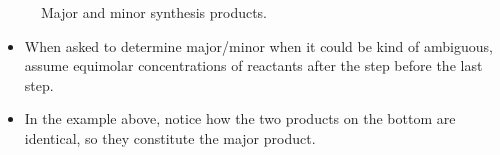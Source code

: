 \documentclass[../notes.tex]{subfiles}
\begin{document}
\begin{itemize}
\begin{figure}[H]
        \caption{Major and minor synthesis products.}
        \label{fig:majorMinor}
    \end{figure}
    \begin{itemize}
        \item When asked to determine major/minor when it could be kind of ambiguous, assume equimolar concentrations of reactants after the step before the last step.
        \item In the example above, notice how the two products on the bottom are identical, so they constitute the major product.
    \end{itemize}
\end{itemize}
\newpage
\end{document}
